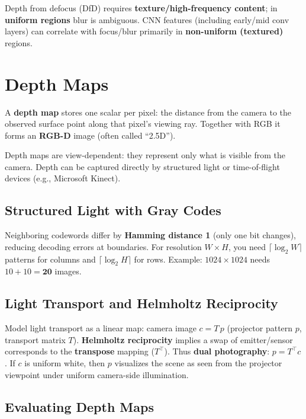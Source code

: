 \documentclass[11pt, oneside]{book}
\begin{document}
\begin{thmbox}[title={Reprojection Error Minimization}]
\begin{defbox}[title={Correlation and Convolution}]
\begin{defbox}[title={ReLU and Pooling}]
\begin{defbox}[title={Segmentation}]
\begin{defbox}[title={Graph-Based Segmentation}]
\begin{defbox}[title={U-Net}]
\begin{defbox}[title={AP and mAP}]
\begin{defbox}[title={Sparse vs.\ Dense Stereo}]
\begin{defbox}[title={SfM Pipeline}]
\begin{defbox}[title={Depth from X}]
Depth from defocus (DfD) requires \textbf{texture/high-frequency content}; in \textbf{uniform regions} blur is ambiguous.
CNN features (including early/mid conv layers) can correlate with focus/blur primarily in \textbf{non-uniform (textured)} regions.

\section{Depth Maps}

\begin{defbox}[title={Depth Map}]
A \textbf{depth map} stores one scalar per pixel: the distance from the camera to the observed surface point
along that pixel's viewing ray.
Together with RGB it forms an \textbf{RGB-D} image (often called ``2.5D'').
\end{defbox}

Depth maps are view-dependent: they represent only what is visible from the camera.
Depth can be captured directly by structured light or time-of-flight devices (e.g., Microsoft Kinect).

\subsection{Structured Light with Gray Codes}

\begin{notebox}[title={Gray Code Properties}]
Neighboring codewords differ by \textbf{Hamming distance 1} (only one bit changes), reducing decoding errors at boundaries.
For resolution $W\times H$, you need $\lceil\log_2 W\rceil$ patterns for columns and $\lceil\log_2 H\rceil$ for rows.
Example: $1024\times1024$ needs $10+10=\textbf{20}$ images.
\end{notebox}

\subsection{Light Transport and Helmholtz Reciprocity}

Model light transport as a linear map: camera image $c = T\,p$ (projector pattern $p$, transport matrix $T$).
\textbf{Helmholtz reciprocity} implies a swap of emitter/sensor corresponds to the \textbf{transpose} mapping ($T^\top$).
Thus \textbf{dual photography}: $p = T^\top c$.
If $c$ is uniform white, then $p$ visualizes the scene as seen from the projector viewpoint under uniform camera-side illumination.

\subsection{Evaluating Depth Maps}


\end{defbox}
\end{defbox}
\end{defbox}
\end{defbox}
\end{defbox}
\end{defbox}
\end{defbox}
\end{defbox}
\end{defbox}
\end{thmbox}
\end{document}
